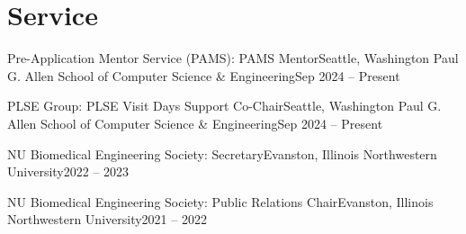\documentclass{resume}
\begin{document}
  \resumeSubHeadingListEnd


\section{Service}
  \vspace{3pt}
  \resumeSubHeadingListStart

    \resumeSubheading
      {Pre-Application Mentor Service (PAMS): \textnormal{PAMS Mentor}}{Seattle, Washington}
      {Paul G. Allen School of Computer Science \& Engineering}{Sep 2024 – Present}
    
    \resumeSubheading
      {PLSE Group: \textnormal{PLSE Visit Days Support Co-Chair}}{Seattle, Washington}
      {Paul G. Allen School of Computer Science \& Engineering}{Sep 2024 – Present}

    \resumeSubheading
      {NU Biomedical Engineering Society: \textnormal{Secretary}}{Evanston, Illinois}
      {Northwestern University}{2022 – 2023}

      \resumeSubheading
      {NU Biomedical Engineering Society: \textnormal{Public Relations Chair}}{Evanston, Illinois}
      {Northwestern University}{2021 – 2022}
    
  \resumeSubHeadingListEnd
\end{document}
